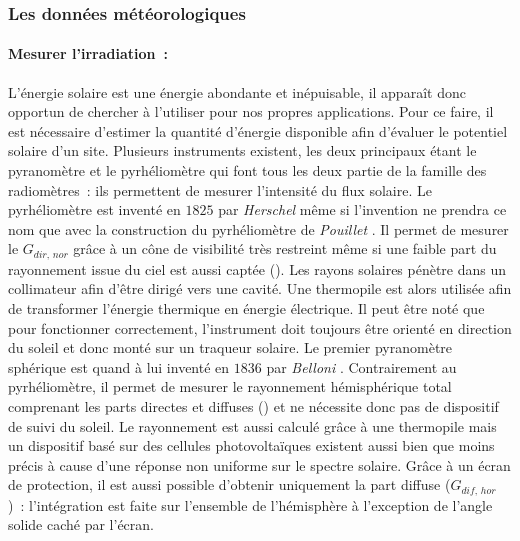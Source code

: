 \subsubsection{Les données météorologiques} %
\label{ssub:les_donnees_meteorologiques}
\paragraph{Mesurer l’irradiation~:} %
\label{par:mesurer_l_irradiation_}
L’énergie solaire est une énergie abondante et inépuisable, il apparaît donc opportun
de chercher à l’utiliser pour nos propres applications. Pour ce faire, il est nécessaire
d’estimer la quantité d’énergie disponible afin d’évaluer le potentiel solaire d’un site.
Plusieurs instruments existent, les deux principaux étant le pyranomètre et le
pyrhéliomètre qui font tous les deux partie de la famille des radiomètres~: ils permettent
de mesurer l’intensité du flux solaire. Le pyrhéliomètre est inventé en $1825$ par
\textit{Herschel} \parencite{Kutz2013} même si l’invention ne prendra ce nom que avec la
construction du pyrhéliomètre de \textit{Pouillet} \parencite{Boer1985}. Il permet de
mesurer le $G_{dir,\,nor}$ grâce à un cône de visibilité très restreint même si une faible
part du rayonnement issue du ciel est aussi captée ().
Les rayons solaires pénètre dans un collimateur afin d’être dirigé vers une cavité. Une
thermopile est alors utilisée afin de transformer l’énergie thermique en énergie
électrique. Il peut être noté que pour fonctionner correctement, l’instrument doit
toujours être orienté en direction du soleil et donc monté sur un traqueur solaire. Le
premier pyranomètre sphérique est quand à lui inventé en $1836$ par \textit{Belloni}
\parencite{Boer1985}. Contrairement au pyrhéliomètre, il permet de mesurer le rayonnement
hémisphérique total comprenant les parts directes et diffuses () et ne nécessite donc pas
de dispositif de suivi du soleil. Le rayonnement est aussi calculé grâce à une thermopile
mais un dispositif basé sur des cellules photovoltaïques existent aussi bien que moins
précis à cause d’une réponse non uniforme sur le spectre solaire. Grâce à un écran de
protection, il est aussi possible d’obtenir uniquement la part diffuse ($G_{dif,\,hor}$)~: l’intégration
est faite sur l’ensemble de l’hémisphère à l’exception de l’angle solide caché par
l’écran.


